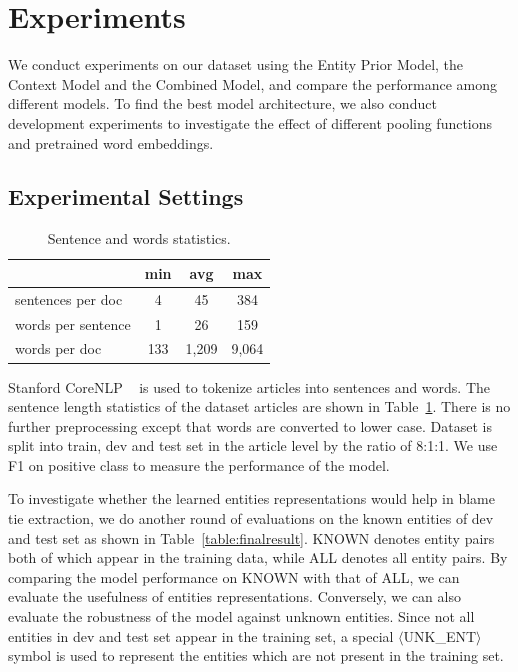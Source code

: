 \documentclass[letterpaper]{article} %
\begin{document}
\section{Experiments}
\label{experiment}

We conduct experiments on our dataset using the Entity Prior Model, the Context Model and the Combined Model, and compare the performance among different models. To find the best model architecture, we also conduct development experiments to investigate the effect of different pooling functions and pretrained word embeddings.

\subsection{Experimental Settings}

\begin{table}[t!]
\centering
\begin{tabular}{l c c c} 
 \hline
 &{\bf min} & {\bf avg}  &{\bf max} \\ 
 \hline\hline
sentences per doc & 4 & 45 & 384 \\ 
words per sentence & 1 & 26 & 159 \\
words per doc & 133 & 1,209 & 9,064 \\
 \hline
\end{tabular}
\caption{Sentence and words statistics.}
\label{table:lengthstatistic}
\end{table}

Stanford CoreNLP ~\cite{manning-EtAl:2014:P14-5} is used to tokenize articles into sentences and words. The sentence length statistics of the dataset articles are shown in Table~\ref{table:lengthstatistic}. There is no further preprocessing except that words are converted to lower case. Dataset is split into train, dev and test set in the article level by the ratio of 8:1:1. We use F1 on positive class to measure the performance of the model.

To investigate whether the learned entities representations would help in blame tie extraction, we do another round of evaluations on the known entities of dev and test set as shown in Table~\ref{table:finalresult}. KNOWN denotes entity pairs both of which appear in the training data, while ALL denotes all entity pairs. By comparing the model performance on KNOWN with that of ALL, we can evaluate the usefulness of entities representations. Conversely, we can also evaluate the robustness of the model against unknown entities. Since not all entities in dev and test set appear in the training set, a special $\langle$UNK\_ENT$\rangle$ symbol is used to represent the entities which are not present in the training set.
\end{document}
